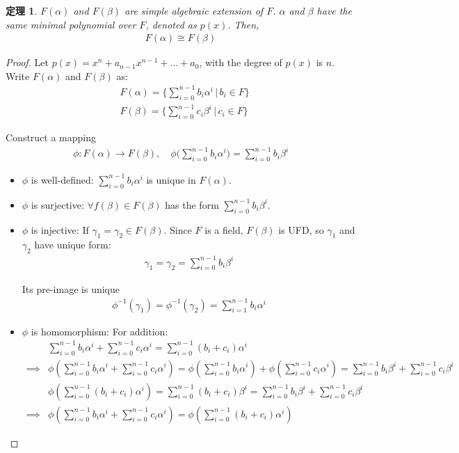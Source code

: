 \documentclass[utf8]{ctexbook}
\newtheorem{theorem}{定理}[section]
\begin{document}
\begin{theorem}
\label{theorem_4_2_iso_simple_alge_extension}
$F(\alpha)$ and $F(\beta)$ are simple algebraic extension of $F$. $\alpha$ and $\beta$ have the same minimal polynomial over $F$, denoted as $p(x)$. Then, 
\begin{align*}
F(\alpha) \cong F(\beta)
\end{align*}
\end{theorem}


\begin{proof}
Let $p(x) = x^n + a_{n-1} x^{n-1} + \ldots + a_0$, with the degree of $p(x)$ is $n$. Write $F(\alpha)$ and $F(\beta)$ as:
\begin{align*}
& F(\alpha) = \{ \sum_{i=0}^{n-1} b_i \alpha^i \, | \, b_i \in F \} \\
& F(\beta) = \{ \sum_{i=0}^{n-1} c_i \beta^i \, | \, c_i \in F \} 
\end{align*}

Construct a mapping
\begin{align*}
\phi: F(\alpha) \longrightarrow F(\beta), \quad \phi\Big(\sum_{i=0}^{n-1} b_i \alpha^i \Big) = \sum_{i=0}^{n-1} b_i \beta^i
\end{align*}

\begin{itemize}
\item{$\phi$ is well-defined: $\sum_{i=0}^{n-1} b_i \alpha^i $ is unique in $F(\alpha)$.}
\item{$\phi$ is surjective: $\forall f(\beta) \in F(\beta)$ has the form $\sum_{i=0}^{n-1} b_i \beta^i$.}
\item{$\phi$ is injective: If $\gamma_1 = \gamma_2 \in F(\beta)$. Since $F$ is a field, $F(\beta)$ is UFD, so $\gamma_1 $ and $\gamma_2$ have unique form:
\begin{align*}
\gamma_1 = \gamma_2 = \sum_{i=0}^{n-1} b_i \beta^i
\end{align*}

Its pre-image is unique
\begin{align*}
\phi^{-1} (\gamma_1 ) = \phi^{-1} (\gamma_2) = \sum_{i=1} ^{n-1} b_i \alpha^i
\end{align*}
}
\item{$\phi$ is homomorphism: 
For addition:
\begin{align*}
& \sum_{i=0}^{n-1} b_i \alpha^i + \sum_{i=0}^{n-1} c_i \alpha^i = \sum_{i=0}^{n-1} (b_i+ c_i) \alpha^i \\
\implies & \phi(\sum_{i=0}^{n-1} b_i \alpha^i + \sum_{i=0}^{n-1} c_i \alpha^i ) = \phi(\sum_{i=0}^{n-1} b_i \alpha^i) + \phi( \sum_{i=0}^{n-1} c_i \alpha^i ) 
= \sum_{i=0}^{n-1} b_i \beta^i + \sum_{i=0}^{n-1} c_i \beta^i \\
 & \phi( \sum_{i=0}^{n-1} (b_i+ c_i) \alpha^i) = \sum_{i=0}^{n-1} (b_i+ c_i) \beta^i 
 = \sum_{i=0}^{n-1} b_i \beta^i + \sum_{i=0}^{n-1} c_i \beta^i \\
 \implies & \phi(\sum_{i=0}^{n-1} b_i \alpha^i + \sum_{i=0}^{n-1} c_i \alpha^i )  = \phi( \sum_{i=0}^{n-1} (b_i+ c_i) \alpha^i) 
\end{align*}

}
\end{itemize}
\end{proof}
\end{document}

